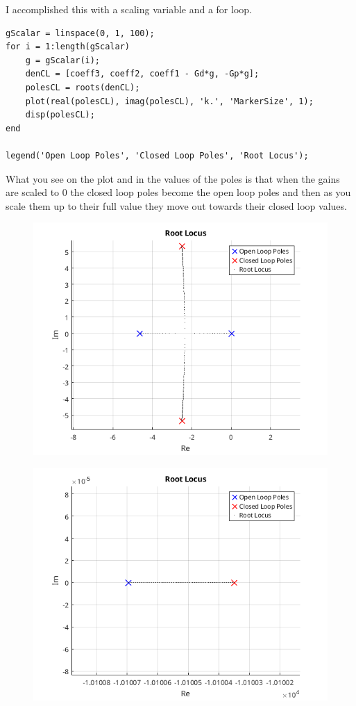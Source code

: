 \documentclass{article}
\begin{document}
I accomplished this with a scaling variable and a for loop.

\begin{lstlisting}[style=matlabstyle]    
gScalar = linspace(0, 1, 100);
for i = 1:length(gScalar)
    g = gScalar(i);
    denCL = [coeff3, coeff2, coeff1 - Gd*g, -Gp*g];
    polesCL = roots(denCL);
    plot(real(polesCL), imag(polesCL), 'k.', 'MarkerSize', 1);
    disp(polesCL);
end

legend('Open Loop Poles', 'Closed Loop Poles', 'Root Locus');
\end{lstlisting}

What you see on the plot and in the values of the poles is that when the gains are scaled to 0 the closed loop poles become the open loop poles and then as you scale them up to their full value they move out towards their closed loop values.

\begin{figure}[H]
    \centering
    \includegraphics[width=\textwidth]{rootLocus.png}
\end{figure}
\begin{figure}[H]
    \centering
    \includegraphics[width=\textwidth]{rootLocusBigNeg.png}
\end{figure}
\end{document}
